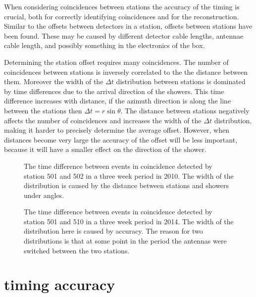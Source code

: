 When considering coincidences between stations the accuracy of the
timing is crucial, both for correctly identifying coincidences and for the reconstruction. Similar to the offsets between detectors in a
station, offsets between stations have been found. These may be caused
by different detector cable lengths, \gps antennae cable length, and
possibly something in the electronics of the \hisparc box.

Determining the station offset requires many coincidences. The number of
coincidences between stations is inversely correlated to the the
distance between them. Moreover the width of the $\Delta t$ distribution between stations is dominated by time differences due to the arrival direction of the showers. This time difference increases with distance, if the azimuth direction is along the line between the stations then $\Delta t = r \sin{\theta}$. The distance between stations negatively affects the number of coincidences and increases the width of the $\Delta t$ distribution, making it harder to precisely determine the average offset. However, when distances become very large the accuracy of the offset will be less important, because it will have a smaller effect on the direction of the shower.

\begin{figure}
    \centering
    
    \caption{ The
             time difference between events in coincidence detected by
             station 501 and 502 in a three week period in 2010. The
             width of the distribution is caused by the distance between
             stations and showers under angles.}
    \label{fig:station_offsets_501_502}
\end{figure}

\begin{figure}
    \centering
    
    \caption{ The
             time difference between events in coincidence detected by
             station 501 and 510 in a three week period in 2014. The
             width of the distribution here is caused by \gps accuracy.
             The reason for two distributions is that at some point in
             the period the \gps antennas were switched between the two
             stations.}
    \label{fig:station_offsets_501_510}
\end{figure}


\section{\gps timing accuracy}
\label{sec:gps_accuracy}

